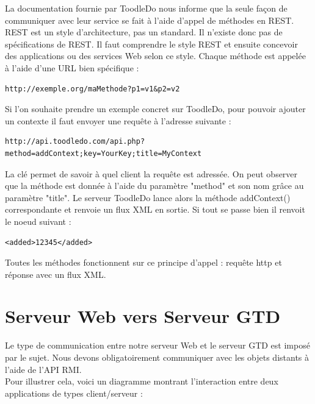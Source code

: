 La documentation fournie par ToodleDo nous informe que la seule façon de communiquer avec leur service se fait à l'aide d'appel de méthodes en REST. \\
REST est un style d'architecture, pas un standard. Il n'existe donc pas de spécifications de REST. Il faut comprendre le style REST et ensuite concevoir des applications ou des services Web selon ce style.
\bigskip
Chaque méthode est appelée à l'aide d'une URL bien spécifique :

\begin{verbatim}
http://exemple.org/maMethode?p1=v1&p2=v2
\end{verbatim}

Si l'on souhaite prendre un exemple concret sur ToodleDo, pour pouvoir ajouter un contexte il faut envoyer une requête à l'adresse suivante :
\begin{verbatim}
http://api.toodledo.com/api.php?method=addContext;key=YourKey;title=MyContext
\end{verbatim}

La clé permet de savoir à quel client la requête est adressée. On peut observer que la méthode est donnée à l'aide du paramètre "method" et son nom grâce au paramètre "title".
\bigskip
Le serveur ToodleDo lance alors la méthode addContext() correspondante et renvoie un flux XML en sortie. Si tout se passe bien il renvoit le noeud suivant :
\begin{verbatim}
<added>12345</added>
\end{verbatim}

Toutes les méthodes fonctionnent sur ce principe d'appel : requête http et réponse avec un flux XML.

\chapter{Serveur Web vers Serveur GTD}

Le type de communication entre notre serveur Web et le serveur GTD est imposé par le sujet. Nous devons obligatoirement communiquer avec les objets distants à l'aide de l'API RMI.
\\
Pour illustrer cela, voici un diagramme montrant l'interaction entre deux applications de types client/serveur :\\

